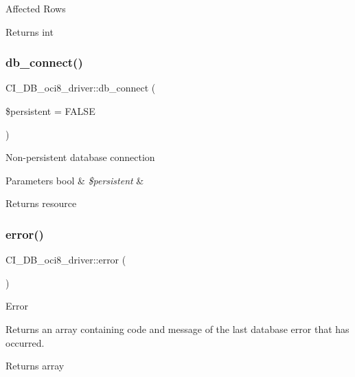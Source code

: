 Affected Rows

\begin{DoxyReturn}{Returns}
int 
\end{DoxyReturn}
\mbox{\label{class_c_i___d_b__oci8__driver_a9e509db34aa9a73203e62ba3bcd10ba2}} 
\subsubsection{\texorpdfstring{db\+\_\+connect()}{db\_connect()}}
{\footnotesize\ttfamily C\+I\+\_\+\+D\+B\+\_\+oci8\+\_\+driver\+::db\+\_\+connect (\begin{DoxyParamCaption}\item[{}]{\$persistent = {\ttfamily FALSE} }\end{DoxyParamCaption})}

Non-\/persistent database connection


\begin{DoxyParams}[1]{Parameters}
bool & {\em \$persistent} & \\
\hline
\end{DoxyParams}
\begin{DoxyReturn}{Returns}
resource 
\end{DoxyReturn}
\mbox{\label{class_c_i___d_b__oci8__driver_aa0479e1c0c3ce65a16aa3f4abf583a73}} 
\subsubsection{\texorpdfstring{error()}{error()}}
{\footnotesize\ttfamily C\+I\+\_\+\+D\+B\+\_\+oci8\+\_\+driver\+::error (\begin{DoxyParamCaption}{ }\end{DoxyParamCaption})}

Error

Returns an array containing code and message of the last database error that has occurred.

\begin{DoxyReturn}{Returns}
array 
\end{DoxyReturn}
\mbox{\label{class_c_i___d_b__oci8__driver_a3c875d27a5c26a83e6d005a34bbfdf54}} 
